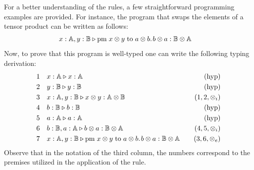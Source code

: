 For a better understanding of the rules, a few straightforward programming examples are provided.  For instance, the program that swaps the elements of a tensor product can be written as follows:
\begin{equation*}
\begin{split}
& x : \mathbb{A},  y : \mathbb{B} \triangleright \text{pm} \hspace{3 pt} x \otimes y\hspace{3 pt} \text{to} \hspace{3 pt} a \otimes b. \hspace{1pt} b \otimes a : \mathbb{B} \otimes \mathbb{A}
\end{split}
\end{equation*}
Now, to prove that this program is well-typed one can write the following typing derivation:
\begin{equation*}
\begin{split}
1 \hspace{10 pt} & x : \mathbb{A} \triangleright x : \mathbb{A}  \hspace{10 pt} & {(\text{hyp})} \\
2 \hspace{10 pt} &  y : \mathbb{B} \triangleright   y : \mathbb{B} \hspace{10 pt} & {(\text{hyp})} \\
3 \hspace{10 pt} & x : \mathbb{A},  y : \mathbb{B} \triangleright x \otimes y : \mathbb{A} \otimes \mathbb{B} \hspace{10pt} & \text{($1,2,\otimes_i$)} \\
4 \hspace{10 pt} &  b : \mathbb{B} \triangleright   b : \mathbb{B} \hspace{10 pt}&{(\text{hyp})} \\
5 \hspace{10 pt} &   a : \mathbb{A} \triangleright  a : \mathbb{A} \hspace{10 pt}&{(\text{hyp})} \\
6 \hspace{10 pt} &   b : \mathbb{B},a : \mathbb{A} \triangleright b \otimes a : \mathbb{B} \otimes \mathbb{A} \hspace{10pt} &\text{($4,5,\otimes_i$)} \\
7\hspace{10 pt}& x : \mathbb{A},  y : \mathbb{B} \triangleright \text{pm} \hspace{3 pt} x \otimes y\hspace{3 pt} \text{to} \hspace{3 pt} a \otimes b. \hspace{1pt} b \otimes a : \mathbb{B} \otimes \mathbb{A}& \hspace{10pt} \text{($3,6,\otimes_e$)}
\end{split}
\end{equation*}
Observe that in the notation of the third column, the numbers correspond to the premises utilized in the application of the rule.

